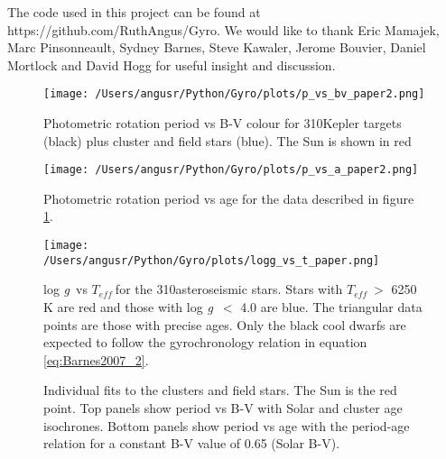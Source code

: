 \documentclass[10pt,preprint]{aastex}
\newcommand{\logg}{log \emph{g}~}
\newcommand{\teff}{$T_{eff}~$}
\newcommand{\nastero}{310}
\begin{document}
The code used in this project can be found at https://github.com/RuthAngus/Gyro.
We would like to thank Eric Mamajek, Marc Pinsonneault, Sydney Barnes, Steve Kawaler, Jerome Bouvier, Daniel Mortlock and David Hogg for useful insight and discussion.




\begin{figure}[ht]
\begin{center}
\texttt{[image: /Users/angusr/Python/Gyro/plots/p\_vs\_bv\_paper2.png]}
\caption{Photometric rotation period vs B-V colour for \nastero Kepler targets (black) plus cluster and field stars (blue). The Sun is shown in red}
\label{fig:3d}
\end{center}
\end{figure}

\begin{figure}[ht]
\begin{center}
\texttt{[image: /Users/angusr/Python/Gyro/plots/p\_vs\_a\_paper2.png]}
\caption{Photometric rotation period vs age for the data described in figure \ref{fig:3d}.}
\label{fig:p_vs_a}
\end{center}
\end{figure}

\begin{figure}[ht]
\begin{center}
\texttt{[image: /Users/angusr/Python/Gyro/plots/logg\_vs\_t\_paper.png]}
\caption{\logg vs \teff for the \nastero asteroseismic stars. Stars with \teff $>$ 6250 K are red and those with \logg $<$ 4.0 are blue. The triangular data points are those with precise ages. Only the black cool dwarfs are expected to follow the gyrochronology relation in equation \ref{eq:Barnes2007_2}.}
\label{fig:p_vs_a}
\end{center}
\end{figure}

\begin{figure}[ht]
\begin{center}
    \end{center}
    \caption{ Individual fits to the clusters and field stars. The Sun is the red point. Top panels show period vs B-V with Solar and cluster age isochrones. Bottom panels show period vs age with the period-age relation for a constant B-V value of 0.65 (Solar B-V).}
   \label{fig:subfigures2}
\end{figure}
\end{document}
